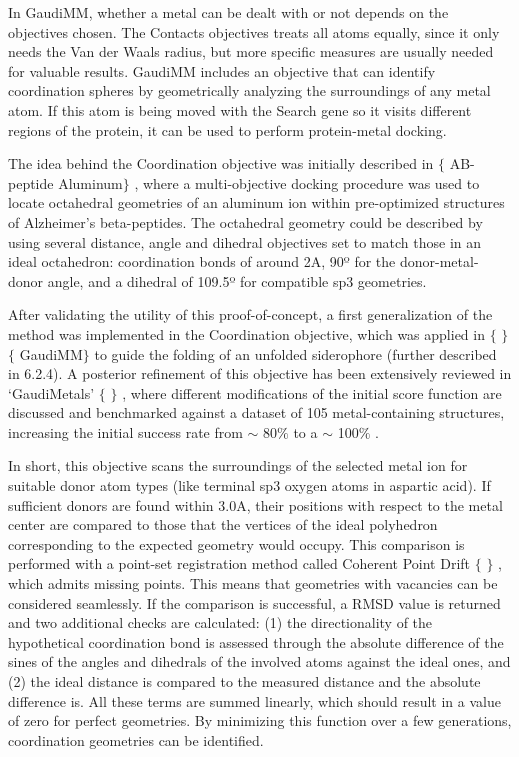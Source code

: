 In GaudiMM, whether a metal can be dealt with or not depends on the objectives chosen. The Contacts objectives treats all atoms equally, since it only needs the Van der Waals radius, but more specific measures are usually needed for valuable results. GaudiMM includes an objective that can identify coordination spheres by geometrically analyzing the surroundings of any metal atom. If this atom is being moved with the Search gene so it visits different regions of the protein, it can be used to perform protein-metal docking.

The idea behind the Coordination objective was initially described in $ \{ $ AB-peptide Aluminum$ \} $ , where a multi-objective docking procedure was used to locate octahedral geometries of an aluminum ion within pre-optimized structures of Alzheimer’s beta-peptides. The octahedral geometry could be described by using several distance, angle and dihedral objectives set to match those in an ideal octahedron: coordination bonds of around 2A, 90º for the donor-metal-donor angle, and a dihedral of 109.5º for compatible sp3 geometries.

After validating the utility of this proof-of-concept, a first generalization of the method was implemented in the Coordination objective, which was applied in $ \{ $ $ \} $ $ \{ $ GaudiMM$ \} $  to guide the folding of an unfolded siderophore (further described in 6.2.4). A posterior refinement of this objective has been extensively reviewed in ‘GaudiMetals’ $ \{ $ $ \} $ , where different modifications of the initial score function are discussed and benchmarked against a dataset of 105 metal-containing structures, increasing the initial success rate from $ \sim $ 80$\%$  to a $ \sim $ 100$\%$ .

In short, this objective scans the surroundings of the selected metal ion for suitable donor atom types (like terminal sp3 oxygen atoms in aspartic acid). If sufficient donors are found within 3.0A, their positions with respect to the metal center are compared to those that the vertices of the ideal polyhedron corresponding to the expected geometry would occupy. This comparison is performed with a point-set registration method called Coherent Point Drift $ \{ $ $ \} $ , which admits missing points. This means that geometries with vacancies can be considered seamlessly. If the comparison is successful, a RMSD value is returned and two additional checks are calculated: (1) the directionality of the hypothetical coordination bond is assessed through the absolute difference of the sines of the angles and dihedrals of the involved atoms against the ideal ones, and (2) the ideal distance is compared to the measured distance and the absolute difference is. All these terms are summed linearly, which should result in a value of zero for perfect geometries. By minimizing this function over a few generations, coordination geometries can be identified.

